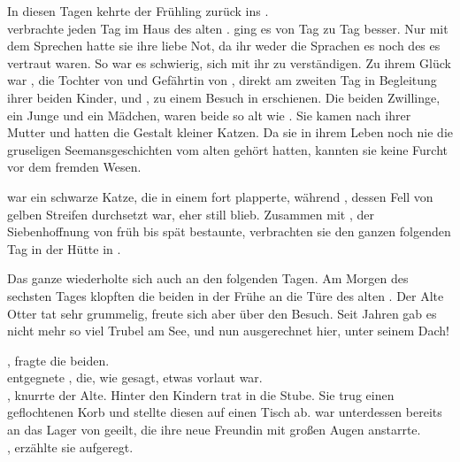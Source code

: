 \begin{Large}
In diesen Tagen kehrte der Frühling zurück ins {\Enland}.\\
{\Salbana} verbrachte jeden Tag im Haus des alten {\Marn}. {\Sepa} ging es von Tag zu Tag besser. Nur mit dem Sprechen hatte sie ihre liebe Not, da ihr weder die Sprachen {\Rhinland}es noch des {\Enland}es vertraut waren. So war es schwierig, sich mit ihr zu verständigen. Zu ihrem Glück war {\Mena}, die Tochter von {\Eno} und Gefährtin von {\Nox}, direkt am zweiten Tag in Begleitung ihrer beiden Kinder, {\Enno} und {\Ena}, zu einem Besuch in {\AltBerna} erschienen. Die beiden Zwillinge, ein Junge und ein Mädchen, waren beide so alt wie {\Sepa}. Sie kamen nach ihrer Mutter und hatten die Gestalt kleiner Katzen. Da sie in ihrem Leben noch nie die gruseligen Seemansgeschichten vom alten {\Marn} gehört hatten, kannten sie keine Furcht vor dem fremden Wesen.

{\Ena} war ein schwarze Katze, die in einem fort plapperte, während {\Enno}, dessen Fell von gelben Streifen durchsetzt war, eher still blieb. Zusammen mit {\Piedo}, der Siebenhoffnung von früh bis spät bestaunte, verbrachten sie den ganzen folgenden Tag in der Hütte in {\AltBerna}. 

Das ganze wiederholte sich auch an den folgenden Tagen. Am Morgen des sechsten Tages klopften die beiden in der Frühe an die Türe des alten {\Marn}. Der Alte Otter {\Marn} tat sehr grummelig, freute sich aber über den Besuch. Seit Jahren gab es nicht mehr so viel Trubel am See, und nun ausgerechnet hier, unter seinem Dach!

, fragte {\Marn} die beiden. \\
 entgegnete {\Ena}, die, wie gesagt, etwas vorlaut war. \\

, knurrte der Alte. Hinter den Kindern trat {\Salbana} in die Stube. Sie trug einen geflochtenen Korb und stellte diesen auf einen Tisch ab. {\Ena} war unterdessen bereits an das Lager von {\Sepa} geeilt, die ihre neue Freundin mit großen Augen anstarrte.\\
, erzählte sie aufgeregt. \\


\end{Large}
